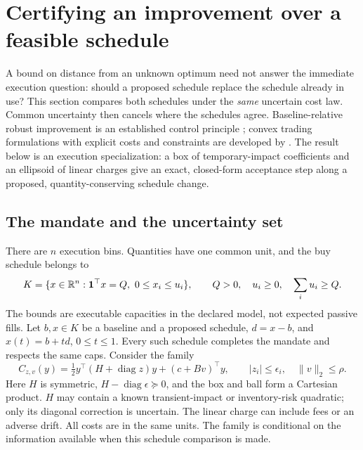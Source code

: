\section{Certifying an improvement over a feasible schedule}
\label{sec:baselineexecution}

A bound on distance from an unknown optimum need not answer the immediate
execution question: should a proposed schedule replace the schedule already
in use? This section compares both schedules under the \emph{same} uncertain
cost law. Common uncertainty then cancels where the schedules agree.
Baseline-relative robust improvement is an established control principle
\citep{GhavamzadehPetrikChow2016}; convex trading formulations with explicit
costs and constraints are developed by \citet{BoydEtAl2017}. The result below
is an execution specialization: a box of temporary-impact coefficients and
an ellipsoid of linear charges give an exact, closed-form acceptance step
along a proposed, quantity-conserving schedule change.

\subsection{The mandate and the uncertainty set}

There are $n$ execution bins. Quantities have one common unit, and the buy
schedule belongs to
\[
 K=\{x\in\mathbb{R}^n: \mathbf1^\top x=Q,\ 0\le x_i\le u_i\},
 \qquad Q>0,\quad u_i\ge0,\quad \sum_i u_i\ge Q.
\]
The bounds are executable capacities in the declared model, not expected
passive fills. Let $b,x\in K$ be a baseline and a proposed schedule,
$d=x-b$, and $x(t)=b+td$, $0\le t\le1$. Every such schedule completes
the mandate and respects the same caps. Consider the family
\begin{equation}\label{eq:baselinefamily}
 C_{z,v}(y)=\tfrac12y^\top(H+\operatorname{diag}z)y
                  +(c+Bv)^\top y,
 \qquad |z_i|\le\epsilon_i,\quad \|v\|_2\le\rho.
\end{equation}
Here $H$ is symmetric, $H-\operatorname{diag}\epsilon\succeq0$,
and the box and ball form a Cartesian product. $H$ may contain a known
transient-impact or inventory-risk quadratic; only its diagonal correction
is uncertain. The linear charge can include fees or an adverse drift.
All costs are in the same units. The family is conditional on the information
available when this schedule comparison is made.

